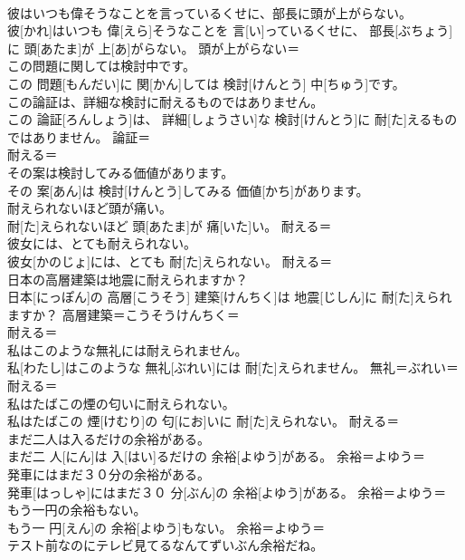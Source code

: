 \documentclass[8pt]{extreport}
\begin{document}
\begin{CJK}{UTF8}{min}
\\	彼はいつも偉そうなことを言っているくせに、部長に頭が上がらない。	
\\	彼[かれ]はいつも 偉[えら]そうなことを 言[い]っているくせに、 部長[ぶちょう]に 頭[あたま]が 上[あ]がらない。	頭が上がらない＝ 
\\	この問題に関しては検討中です。	
\\	この 問題[もんだい]に 関[かん]しては 検討[けんとう] 中[ちゅう]です。	
\\	この論証は、詳細な検討に耐えるものではありません。	
\\	この 論証[ろんしょう]は、 詳細[しょうさい]な 検討[けんとう]に 耐[た]えるものではありません。	論証＝ 
\\	耐える＝ 
\\	その案は検討してみる価値があります。	
\\	その 案[あん]は 検討[けんとう]してみる 価値[かち]があります。	
\\	耐えられないほど頭が痛い。	
\\	耐[た]えられないほど 頭[あたま]が 痛[いた]い。	耐える＝ 
\\	彼女には、とても耐えられない。	
\\	彼女[かのじょ]には、とても 耐[た]えられない。	耐える＝ 
\\	日本の高層建築は地震に耐えられますか？	
\\	日本[にっぽん]の 高層[こうそう] 建築[けんちく]は 地震[じしん]に 耐[た]えられますか？	高層建築＝こうそうけんちく＝ 
\\	耐える＝ 
\\	私はこのような無礼には耐えられません。	
\\	私[わたし]はこのような 無礼[ぶれい]には 耐[た]えられません。	無礼＝ぶれい＝ 
\\	耐える＝ 
\\	私はたばこの煙の匂いに耐えられない。	
\\	私はたばこの 煙[けむり]の 匂[にお]いに 耐[た]えられない。	耐える＝ 
\\	まだ二人は入るだけの余裕がある。	
\\	まだ二 人[にん]は 入[はい]るだけの 余裕[よゆう]がある。	余裕＝よゆう＝ 
\\	発車にはまだ３０分の余裕がある。	
\\	発車[はっしゃ]にはまだ３０ 分[ぶん]の 余裕[よゆう]がある。	余裕＝よゆう＝ 
\\	もう一円の余裕もない。	
\\	もう一 円[えん]の 余裕[よゆう]もない。	余裕＝よゆう＝ 
\\	テスト前なのにテレビ見てるなんてずいぶん余裕だね。	

\end{CJK}
\end{document}
